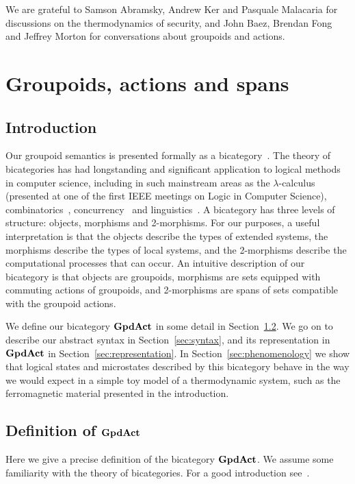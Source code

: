 \documentclass[a4paper,12pt]{article}
\theoremstyle{definition}
\newcommand\cat[1]{{\ensuremath{\bf #1}}}
\renewcommand{\-}[0]{\nobreakdash-\hspace{0pt}}
\newcommand\GA{\cat{GpdAct}{}}
\begin{document}
\noindent
We are grateful to Samson Abramsky, Andrew Ker and Pasquale Malacaria for discussions on the thermodynamics of security, and John Baez, Brendan Fong and Jeffrey Morton for conversations about groupoids and actions.

\section{Groupoids, actions and spans}
\label{sec:2category}

\subsection{Introduction}

\noindent
Our groupoid semantics is presented formally as a bicategory~\cite{borceux, ml97-cwm}. The theory of bicategories has had longstanding and significant application to logical methods in computer science, including in such mainstream areas as the $\lambda$\-calculus~\cite{seely} (presented at one of the first IEEE meetings on Logic in Computer Science), combinatorics~\cite{bicategoryspecies}, concurrency~\cite{presheafpi} and linguistics~\cite{lambek}.
A bicategory has three levels of structure: objects, morphisms and 2-morphisms. For our purposes, a useful interpretation is that the objects describe the types of extended systems, the morphisms describe the types of local systems, and the 2\-morphisms describe the computational processes that can occur. An intuitive description of our bicategory is that objects are groupoids, morphisms are sets equipped with commuting actions of groupoids, and 2\-morphisms are spans of sets compatible with the groupoid actions.

We define our  bicategory $\GA$ in some detail in Section~\ref{fulldefinition}. We go on to describe our abstract syntax in Section~\ref{sec:syntax}, and its representation in $\GA$ in Section~\ref{sec:representation}. In Section~\ref{sec:phenomenology} we show that logical states and microstates described by this bicategory behave in the way we would expect in a simple toy model of a thermodynamic system, such as the ferromagnetic material presented in the introduction.

\subsection{Definition of \GA}
\label{fulldefinition}

\noindent
Here we give a precise definition of the bicategory \GA. We assume some familiarity with the theory of bicategories. For a good introduction see~\mbox{\cite[Chapter 7]{borceux}}.
\end{document}
